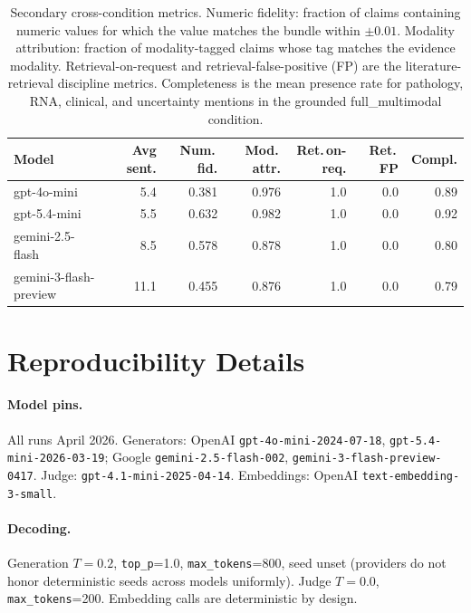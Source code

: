 \documentclass{article}
\theoremstyle{plain}
\begin{document}
\begin{table}[h]
\centering
\small
\setlength{\tabcolsep}{4pt}
\begin{tabular}{lrrrrrr}
\toprule
\textbf{Model} & \textbf{Avg sent.} & \textbf{Num.\,fid.} & \textbf{Mod.\,attr.} & \textbf{Ret.\,on-req.} & \textbf{Ret.\,FP} & \textbf{Compl.} \\
\midrule
gpt-4o-mini             & 5.4  & 0.381 & 0.976 & 1.0 & 0.0 & 0.89 \\
gpt-5.4-mini            & 5.5  & 0.632 & 0.982 & 1.0 & 0.0 & 0.92 \\
gemini-2.5-flash        & 8.5  & 0.578 & 0.878 & 1.0 & 0.0 & 0.80 \\
gemini-3-flash-preview  & 11.1 & 0.455 & 0.876 & 1.0 & 0.0 & 0.79 \\
\bottomrule
\end{tabular}
\caption{Secondary cross-condition metrics. Numeric fidelity: fraction of claims containing numeric values for which the value matches the bundle within $\pm 0.01$. Modality attribution: fraction of modality-tagged claims whose tag matches the evidence modality. Retrieval-on-request and retrieval-false-positive (FP) are the literature-retrieval discipline metrics. Completeness is the mean presence rate for pathology, RNA, clinical, and uncertainty mentions in the grounded full\_multimodal condition.}
\label{tab:secondary}
\end{table}

\section{Reproducibility Details}
\label{app:reproducibility}

\paragraph{Model pins.} All runs April 2026. Generators: OpenAI \texttt{gpt-4o-mini-2024-07-18}, \texttt{gpt-5.4-mini-2026-03-19}; Google \texttt{gemini-2.5-flash-002}, \texttt{gemini-3-flash-preview-0417}. Judge: \texttt{gpt-4.1-mini-2025-04-14}. Embeddings: OpenAI \texttt{text-embedding-3-small}.

\paragraph{Decoding.} Generation $T{=}0.2$, \texttt{top\_p}=1.0, \texttt{max\_tokens}=800, seed unset (providers do not honor deterministic seeds across models uniformly). Judge $T{=}0.0$, \texttt{max\_tokens}=200. Embedding calls are deterministic by design.
\end{document}
